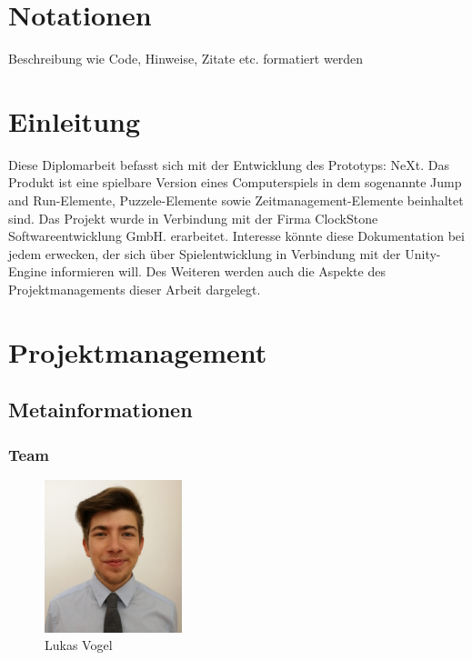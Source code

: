 

\def \currentAuthor {Lukas Vogel} %



\chapter*{Notationen}
Beschreibung wie Code, Hinweise, Zitate etc. formatiert werden  

\chapter{Einleitung}
Diese Diplomarbeit befasst sich mit der Entwicklung des Prototyps: NeXt. Das Produkt ist eine spielbare Version eines Computerspiels in dem sogenannte Jump and Run-Elemente, Puzzele-Elemente sowie Zeitmanagement-Elemente beinhaltet sind. Das Projekt wurde in Verbindung mit der Firma ClockStone Softwareentwicklung GmbH. erarbeitet. Interesse könnte diese Dokumentation bei jedem erwecken,	 der sich über Spielentwicklung in Verbindung mit der Unity-Engine  informieren will. Des Weiteren werden auch die Aspekte des Projektmanagements dieser Arbeit dargelegt.  

\chapter{Projektmanagement}

\section{Metainformationen}
\subsection{Team}

	\begin{figure}[H]
	\centering
		\includegraphics[width=4cm]{images/LukasVogel.png}
		\caption{Lukas Vogel}		
	\end{figure}

